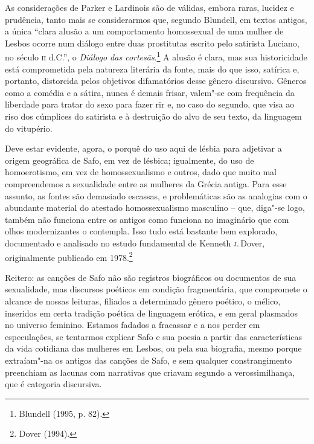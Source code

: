 As considerações de Parker e Lardinois são de válidas, embora raras, lucidez e
prudência, tanto mais se considerarmos que, segundo Blundell, em
textos antigos, a única “clara alusão a um comportamento homossexual de uma
mulher de Lesbos ocorre num diálogo entre duas prostitutas escrito pelo
satirista Luciano, no século \textsc{ii} d.C.”, o \textit{Diálogo das cortesãs}.\footnote{Blundell (1995, p. 82).} A
alusão é clara, mas sua historicidade está comprometida pela natureza
literária da fonte, mais do que isso, satírica e, portanto, distorcida pelos objetivos difamatórios desse gênero discursivo. Gêneros como a
comédia e a sátira, nunca é demais frisar, valem"-se com frequência da liberdade
para tratar do sexo para fazer rir e, no caso do segundo, que visa ao riso dos
cúmplices do satirista e à destruição do alvo de seu texto, da linguagem do
vitupério. 

Deve estar evidente, agora, o porquê do uso aqui de lésbia para adjetivar a origem geográfica de Safo, em vez de lésbica; igualmente, do uso de homoerotismo, em vez de homossexualismo e outros, dado que muito mal compreendemos a sexualidade entre as mulheres da Grécia antiga. Para esse assunto, as fontes são demasiado escassas, e problemáticas são as analogias
com o abundante material do atestado homossexualismo masculino -- que,
diga"-se logo, também não funciona entre os antigos como funciona no imaginário
que com olhos modernizantes o contempla. Isso tudo está bastante
bem explorado, documentado e analisado no estudo fundamental de Kenneth \textsc{j}.\,Dover, 
originalmente publicado em 1978.\footnote{ Dover (1994).}

Reitero: as canções de Safo não
são registros biográficos ou documentos de sua sexualidade, mas discursos
poéticos em condição fragmentária, que compromete o alcance de nossas leituras,
filiados a determinado gênero poético, o mélico, inseridos em certa tradição
poética de linguagem erótica, e em geral plasmados no universo feminino. Estamos fadados a fracassar e a nos perder em
especulações, se tentarmos explicar Safo e sua poesia a partir das
características da vida cotidiana das mulheres em Lesbos, ou pela sua
biografia, mesmo porque extraíam"-na os antigos das canções de Safo, e
sem qualquer constrangimento preenchiam as lacunas com narrativas
que criavam segundo a verossimilhança, que é categoria discursiva.

